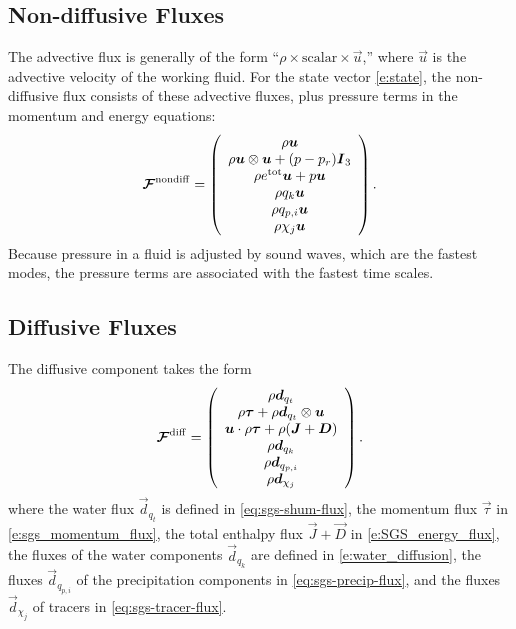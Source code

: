\documentclass{report}
\begin{document}
\subsection{Non-diffusive Fluxes}

The advective flux is generally of the form ``$\rho \times \mathrm{scalar} \times \vec{u}$,'' where $\vec{u}$ is the advective velocity of the working fluid. For the state vector \eqref{e:state}, the non-diffusive flux consists of these advective fluxes, plus pressure terms in the momentum and energy equations: 
 \begin{equation}
 \label{e:adv_flux}
 \boldsymbol{{\mathcal{F}}}^{\mathrm{nondiff}}=\left( \begin{array}{c}
 \rho \boldsymbol{{u}} \\
 \rho \boldsymbol{{u}} \otimes \boldsymbol{{u}} + (p - p_r) \boldsymbol{{I}}_3 \\
 \rho e^{\mathrm{tot}} \boldsymbol{{u}} + p \boldsymbol{{u}}\\
 \rho q_k \boldsymbol{{u}}\\
 \rho q_{p,i} \boldsymbol{{u}} \\
 \rho \chi_j \boldsymbol{{u}}
\end{array}
\right).
 \end{equation}
Because pressure in a fluid is adjusted by sound waves, which are the fastest modes, the pressure terms are associated with the fastest time scales. 

\subsection{Diffusive Fluxes}

 The diffusive component takes the form 
 \begin{equation}
 \boldsymbol{{\mathcal{F}}}^{\mathrm{diff}}=\left( \begin{array}{c}
 \rho\boldsymbol{{d}}_{q_t} \\
 \rho\boldsymbol{{\tau}} + \rho\boldsymbol{{d}}_{q_t} \otimes \boldsymbol{{u}}\\
 \boldsymbol{{u}} \cdot \rho\boldsymbol{{\tau}} + \rho (\boldsymbol{{J}} + \boldsymbol{{D}}) \\
\rho\boldsymbol{{d}}_{q_k}\\
\rho \boldsymbol{{d}}_{q_{p, i}}\\
\rho \boldsymbol{{d}}_{\chi_j}
\end{array}
\right).
\label{eq:diff_flux}
\end{equation}
where the water flux $\vec{d}_{q_t}$ is defined in \eqref{eq:sgs-shum-flux}, the momentum flux $\vec{\tau}$ in \eqref{e:sgs_momentum_flux}, the total enthalpy flux $\vec{J} + \vec{D}$ in \eqref{e:SGS_energy_flux}, the fluxes of the water components $\vec{d}_{q_k}$ are defined in \eqref{e:water_diffusion}, the fluxes $\vec{d}_{q_{p, i}}$ of the precipitation components in \eqref{eq:sgs-precip-flux}, and the fluxes $\vec{d}_{\chi_j}$ of tracers in \eqref{eq:sgs-tracer-flux}.
\end{document}
